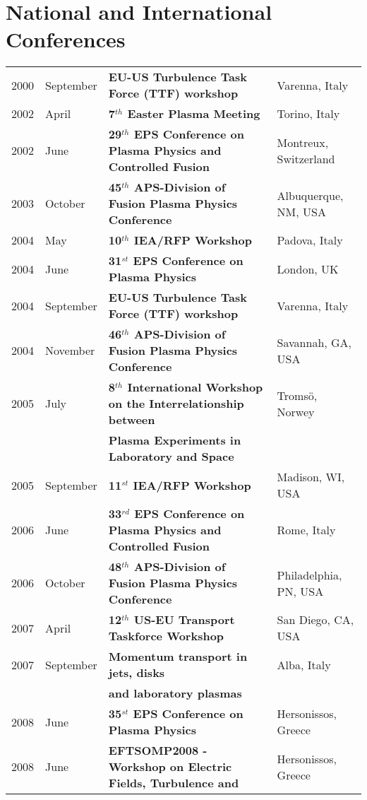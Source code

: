 \section{National and International Conferences}
\begin{longtable}{llll}
2000 & September & \textbf{EU-US Turbulence Task Force (TTF) workshop}
& Varenna, Italy \\
2002 & April & \textbf{7$^{th}$ Easter Plasma Meeting}& Torino, Italy
\\
2002 & June & \textbf{29$^{th}$ EPS Conference on Plasma Physics and
  Controlled Fusion} & Montreux, Switzerland \\
2003 & October & \textbf{45$^{th}$ APS-Division of Fusion Plasma
  Physics Conference}& Albuquerque, NM, USA \\
2004 & May & \textbf{10$^{th}$ IEA/RFP Workshop}& Padova, Italy \\
2004 & June & \textbf{31$^{st}$ EPS Conference on Plasma Physics} &
London, UK \\
2004 & September & \textbf{EU-US Turbulence Task Force (TTF) workshop}
& Varenna, Italy \\
2004 & November & \textbf{46$^{th}$ APS-Division of Fusion Plasma
  Physics Conference} & Savannah, GA, USA \\
2005 & July & \textbf{8$^{th}$ International Workshop on the
  Interrelationship between} & Troms\"o, Norwey \\
 & & \textbf{Plasma Experiments in Laboratory and
  Space} & \\
2005 & September & \textbf{11$^{st}$ IEA/RFP Workshop} & Madison, WI,
USA \\
2006 & June & \textbf{33$^{rd}$ EPS Conference on Plasma Physics and
  Controlled Fusion} & Rome, Italy \\
2006 & October & \textbf{48$^{th}$ APS-Division of Fusion Plasma
  Physics Conference} & Philadelphia, PN, USA \\
2007 & April & \textbf{12$^{th}$ US-EU Transport Taskforce Workshop} &
San Diego, CA, USA \\
2007 & September & \textbf{Momentum transport in jets, disks} & Alba,
Italy \\
& & \textbf{ and laboratory plasmas} & \\
2008 & June & \textbf{35$^{st}$ EPS Conference on Plasma Physics} &
Hersonissos, Greece \\
2008 & June & \textbf{EFTSOMP2008 - Workshop on Electric Fields, Turbulence
                 and} & Hersonissos, Greece \\

\end{longtable}
